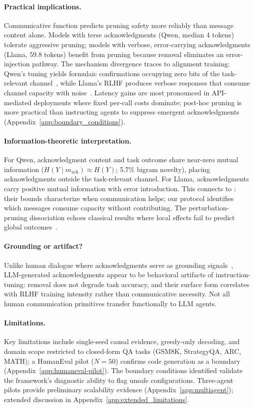 \paragraph{Practical implications.}
Communicative function predicts pruning safety more reliably than message content alone. Models with terse acknowledgments (Qwen, median 4 tokens) tolerate aggressive pruning; models with verbose, error-carrying acknowledgments (Llama, 59.8 tokens) benefit from pruning because removal eliminates an error-injection pathway. The mechanism divergence traces to alignment training: Qwen's tuning yields formulaic confirmations occupying zero bits of the task-relevant channel~\citep{clark_contributing_1989}, while Llama's RLHF produces verbose responses that consume channel capacity with noise~\citep{shannon_1948}. Latency gains are most pronounced in API-mediated deployments where fixed per-call costs dominate; post-hoc pruning is more practical than instructing agents to suppress emergent acknowledgments (Appendix~\ref{app:boundary_conditions}).

\paragraph{Information-theoretic interpretation.}
For Qwen, acknowledgment content and task outcome share near-zero mutual information ($H(Y \mid m_{\mathrm{ack}}) \approx H(Y)$; 5.7\% bigram novelty), placing acknowledgments outside the task-relevant channel. For Llama, acknowledgments carry positive mutual information with error introduction. This connects to \citet{rizvi_martel_communication_2026}: their bounds characterize when communication helps; our protocol identifies which messages consume capacity without contributing. The perturbation-pruning dissociation echoes classical results where local effects fail to predict global outcomes~\citep{lecun_obd_1990, braess_1968}.

\paragraph{Grounding or artifact?}
Unlike human dialogue where acknowledgments serve as grounding signals~\citep{clark_contributing_1989, clark_brennan_1991}, LLM-generated acknowledgments appear to be behavioral artifacts of instruction-tuning: removal does not degrade task accuracy, and their surface form correlates with RLHF training intensity rather than communicative necessity. Not all human communication primitives transfer functionally to LLM agents.

\paragraph{Limitations.}
Key limitations include single-seed causal evidence, greedy-only decoding, and domain scope restricted to closed-form QA tasks (GSM8K, StrategyQA, ARC, MATH); a HumanEval pilot ($N{=}50$) confirms code generation as a boundary (Appendix~\ref{app:humaneval-pilot}). The boundary conditions identified validate the framework's diagnostic ability to flag unsafe configurations. Three-agent pilots provide preliminary scalability evidence (Appendix~\ref{app:multiagent}); extended discussion in Appendix~\ref{app:extended_limitations}.
